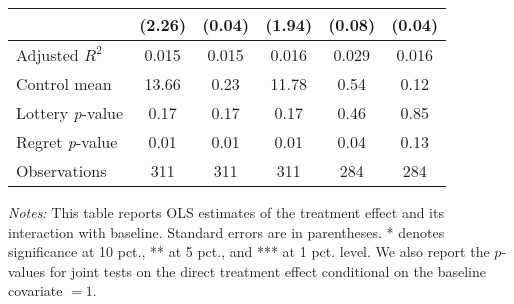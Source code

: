 \begin{table}[htbp]
{\begin{threeparttable}
\begin{tabular}{l*{5}{c}}
                &   (2.26)         &   (0.04)         &   (1.94)         &   (0.08)         &   (0.04)         \\
\midrule
Adjusted \(R^{2}\)&    0.015         &    0.015         &    0.016         &    0.029         &    0.016         \\
Control mean    &    13.66         &     0.23         &    11.78         &     0.54         &     0.12         \\
Lottery \emph{p}-value&     0.17         &     0.17         &     0.17         &     0.46         &     0.85         \\
Regret \emph{p}-value&     0.01         &     0.01         &     0.01         &     0.04         &     0.13         \\
Observations    &      311         &      311         &      311         &      284         &      284         \\
\bottomrule \end{tabular} \begin{tablenotes}[flushleft] \footnotesize \item \emph{Notes:} This table reports OLS estimates of the treatment effect and its interaction with baseline. Standard errors are in parentheses. * denotes significance at 10 pct., ** at 5 pct., and *** at 1 pct. level. We also report the \(p\)-values for joint tests on the direct treatment effect conditional on the baseline covariate $= 1$. \end{tablenotes} \end{threeparttable} } \end{table}

